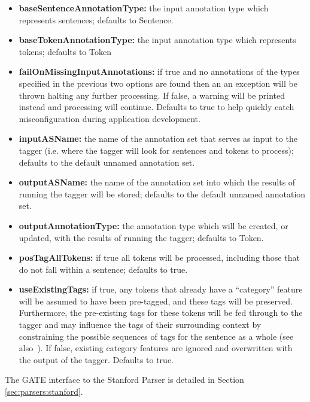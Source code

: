 \begin{itemize}
\item \textbf{baseSentenceAnnotationType:} the input annotation type which
  represents sentences; defaults to Sentence.
\item \textbf{baseTokenAnnotationType:} the input annotation type which
  represents tokens; defaults to Token
\item \textbf{failOnMissingInputAnnotations:} if true and no annotations of
  the types specified in the previous two options are found then an an
  exception will be thrown halting any further processing. If false, a warning
  will be printed instead and processing will continue. Defaults to true to help
  quickly catch misconfiguration during application development.
\item \textbf{inputASName:} the name of the annotation set that serves as input
  to the tagger (i.e. where the tagger will look for sentences and tokens to
  process); defaults to the default unnamed annotation set.
\item \textbf{outputASName:} the name of the annotation set into which the
  results of running the tagger will be stored; defaults to the default unnamed
  annotation set.
\item \textbf{outputAnnotationType:} the annotation type which will be created,
  or updated, with the results of running the tagger; defaults to Token.
\item \textbf{posTagAllTokens:} if true all tokens will be processed, including
  those that do not fall within a sentence; defaults to true.
\item \textbf{useExistingTags:} if true, any tokens that already have a
  ``category'' feature will be assumed to have been pre-tagged, and these tags
  will be preserved.  Furthermore, the pre-existing tags for these tokens will
  be fed through to the tagger and may influence the tags of their
  surrounding context by constraining the possible sequences of tags for the
  sentence as a whole (see also~\cite{Derczynski2013c}).  If false, existing
  category features are ignored and overwritten with the output of the tagger.
  Defaults to true.
\end{itemize}


The GATE interface to the Stanford Parser is detailed in Section \ref{sec:parsers:stanford}.


